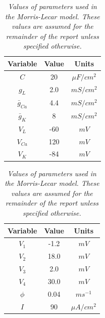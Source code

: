 \documentclass[letterpaper,12pt]{article}
\numberwithin{table}{section}
\numberwithin{figure}{section}
\numberwithin{equation}{section}
\newcommand{\ccaption}[1]{\caption{\textit{#1}}}
\begin{document}
\begin{flushleft}
\begin{table}[h]
\begin{subtable}{0.49\linewidth}
            \begin{tabular}{ | c | c | c | }
                \hline
                Variable & Value & Units \\
                \hline\hline
                $C$ & 20 & $\mu F/cm^2$ \\
                \hline
                $g_L$ & 2.0 & $mS/cm^2$ \\
                \hline
                $\bar{g}_{Ca}$ & 4.4 & $mS/cm^2$ \\
                \hline
                $\bar{g}_K$ & 8 & $mS/cm^2$ \\
                \hline
                $V_L$ & -60 & $mV$ \\
                \hline
                $V_{Ca}$ & 120 & $mV$ \\
                \hline
                $V_K$ & -84 & $mV$ \\
                \hline
            \end{tabular}

        \end{subtable}
        \begin{subtable}{0.49\linewidth}

            \centering

            \begin{tabular}{ | c | c | c | }
                \hline
                Variable & Value & Units \\
                \hline\hline
                $V_1$ & -1.2 & $mV$ \\
                \hline
                $V_2$ & 18.0 & $mV$ \\
                \hline
                $V_3$ & 2.0 & $mV$ \\
                \hline
                $V_4$ & 30.0 & $mV$ \\
                \hline
                $\phi$ & 0.04 & $ms^{-1}$ \\
                \hline
                $I$ & 90 & $\mu A/cm^2$ \\
                \hline

            \end{tabular}

        \end{subtable}

        \captionsetup{width=0.85\linewidth}
        \ccaption{Values of parameters used in the Morris-Lecar model. These values are assumed for the remainder of the report unless specified otherwise.}
        \label{tab:ml-param}


\end{table}
\end{flushleft}
\end{document}
